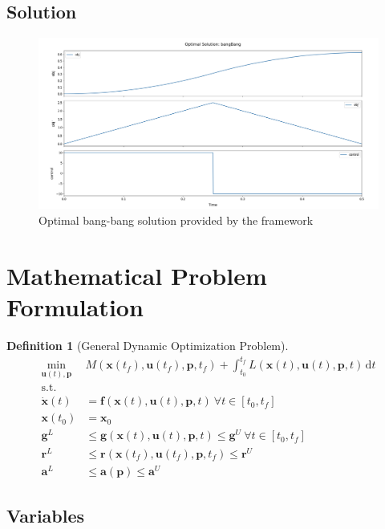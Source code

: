 \documentclass[12pt]{article}
\newtheorem{definition}{Definition}
\renewcommand{\v}{\bm}
\begin{document}
	\subsection{Solution}
	
	\begin{figure}[H]
		\centering
		\includegraphics[width=\textwidth]{images/bangBang.png}
		\caption{Optimal bang-bang solution provided by the framework}
		\label{fig:bangBang}
	\end{figure}


	\section{Mathematical Problem Formulation}
	
	\begin{definition}[General Dynamic Optimization Problem] \label{def:GDOP}
		\begin{align*}
			\min_{\v{u}(t), \v{p}} ~ & M(\v{x}(t_f), \v{u}(t_f), \v{p}, t_f) + \int_{t_0}^{t_f} L(\v{x}(t), \v{u}(t), \v{p}, t) \, \mathrm{d}t \\
			\text{s.t.}& \\
			\dot{\v{x}}(t) &= \v{f}(\v{x}(t), \v{u}(t), \v{p}, t)\ \forall t \in [t_0, t_f] \\
			\v{x}(t_0) &= \v{x}_0 \\
			\v{g}^{L} &\leq \v{g}(\v{x}(t), \v{u}(t), \v{p}, t) \leq \v{g}^{U}\ \forall t \in [t_0, t_f] \\
			\v{r}^{L} &\leq \v{r}(\v{x}(t_f), \v{u}(t_f), \v{p}, t_f) \leq \v{r}^{U} \\
			\v{a}^{L} &\leq \v{a}(\v{p}) \leq \v{a}^{U}
		\end{align*}
	\end{definition}
	
	
	\subsection{Variables}
	
\end{document}
